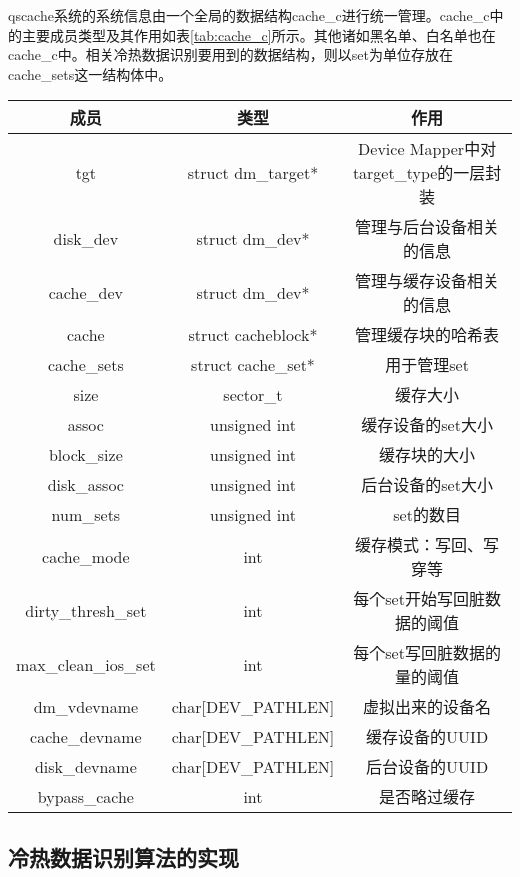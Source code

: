 qscache系统的系统信息由一个全局的数据结构cache\_c进行统一管理。cache\_c中的主要成员类型及其作用如表\ref{tab:cache_c}所示。其他诸如黑名单、白名单也在cache\_c中。相关冷热数据识别要用到的数据结构，则以set为单位存放在cache\_sets这一结构体中。

\begin{table}[!htbp]
    \centering
    \begin{tabular}{ccc} 
        \toprule
        成员 & 类型 & 作用\\
        \midrule
        tgt & struct dm\_target* & Device Mapper中对target\_type的一层封装 \\ 
        disk\_dev & struct dm\_dev* & 管理与后台设备相关的信息 \\ 
        cache\_dev & struct dm\_dev* & 管理与缓存设备相关的信息 \\ 
        cache & struct cacheblock* & 管理缓存块的哈希表 \\ 
        cache\_sets & struct cache\_set* & 用于管理set \\ 
        size & sector\_t & 缓存大小 \\ 
        assoc & unsigned int & 缓存设备的set大小 \\ 
        block\_size & unsigned int & 缓存块的大小 \\ 
        disk\_assoc & unsigned int & 后台设备的set大小 \\ 
        num\_sets & unsigned int & set的数目 \\ 
        cache\_mode & int & 缓存模式：写回、写穿等 \\ 
        dirty\_thresh\_set & int & 每个set开始写回脏数据的阈值 \\ 
        max\_clean\_ios\_set & int & 每个set写回脏数据的量的阈值 \\ 
        dm\_vdevname & char[DEV\_PATHLEN] & 虚拟出来的设备名 \\ 
        cache\_devname & char[DEV\_PATHLEN] & 缓存设备的UUID \\ 
        disk\_devname & char[DEV\_PATHLEN] & 后台设备的UUID \\ 
        bypass\_cache & int & 是否略过缓存 \\      
        \bottomrule
    \end{tabular}
\end{table}

\subsection{冷热数据识别算法的实现}

